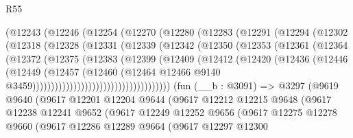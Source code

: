 \begin{lexlean}{R55}
\begin{coremodule}
                (@12243
                  (@12246
                    (@12254
                      (@12270
                        (@12280
                          (@12283
                            (@12291
                              (@12294
                                (@12302
                                  (@12318
                                    (@12328
                                      (@12331
                                        (@12339
                                          (@12342
                                            (@12350
                                              (@12353
                                                (@12361
                                                  (@12364
                                                    (@12372
                                                      (@12375
                                                        (@12383
                                                          (@12399
                                                            (@12409
                                                              (@12412
                                                                (@12420
                                                                  (@12436
                                                                    (@12446
                                                                      (@12449
                                                                        (@12457
                                                                          (@12460
                                                                            (@12464
                                                                              @12466
                                                                              @9140
                                                                              @3459)))))))))))))))))))))))))))))))))))))
    (fun (__b : @3091) =>
    @3297
      (@9619
        @9640
        (@9617
          @12201
          @12204
          @9644
          (@9617
            @12212
            @12215
            @9648
            (@9617
              @12238
              @12241
              @9652
              (@9617
                @12249
                @12252
                @9656
                (@9617
                  @12275
                  @12278
                  @9660
                  (@9617
                    @12286
                    @12289
                    @9664
                    (@9617
                      @12297
                      @12300

\end{coremodule}
\end{lexlean}
